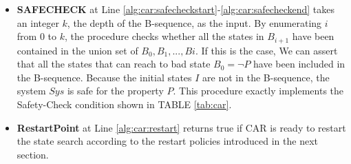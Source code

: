 \begin{itemize}
    \item \textbf{SAFECHECK} at Line \ref{alg:car:safecheckstart}-\ref{alg:car:safecheckend} takes an integer $k$, the depth of the B-sequence, as the input. By enumerating $i$ from $0$ to $k$, the procedure checks whether all the states in $B_{i+1}$ have been contained in the union set of $B_{0},B_{1},...,B{i}$. If this is the case, We can assert that all the states that can reach to bad state $B_{0}=\neg P$ have been included in the B-sequence. Because the initial states $I$ are not in the B-sequence, the system $Sys$ is safe for the property $P$. This procedure exactly implements the Safety-Check condition shown in TABLE \ref{tab:car}.
    \item \textbf{RestartPoint} at Line \ref{alg:car:restart} returns true if CAR is ready to restart the state search according to the restart policies introduced in the next section.
    

\end{itemize}
